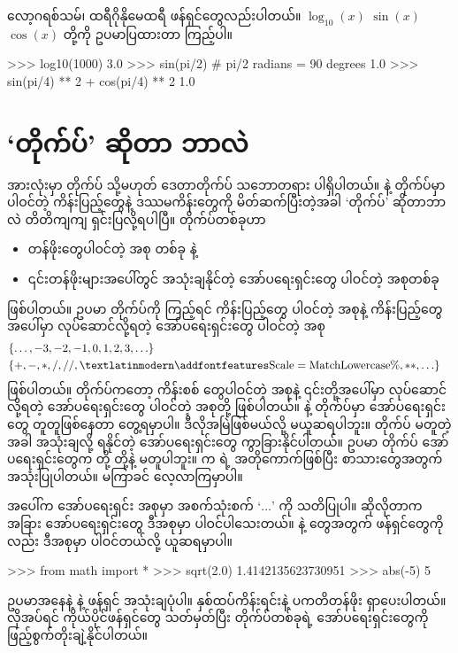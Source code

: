 လော့ဂရစ်သမ်၊ ထရီဂိုနိုမေထရီ ဖန်ရှင်တွေလည်းပါတယ်။ $\log_{10}(x)$\fEn{,} $\sin(x)$\fEn{,} $\cos(x)$ တို့ကို ဥပမာပြထားတာ ကြည့်ပါ။
\begin{codetxt}
>>> log10(1000)
3.0
>>> sin(pi/2) # pi/2 radians = 90 degrees
1.0
>>> sin(pi/4) ** 2 + cos(pi/4) ** 2
1.0
\end{codetxt}


\section{‘တိုက်ပ်’ ဆိုတာ ဘာလဲ}
 အားလုံးမှာ တိုက်ပ် သို့မဟုတ် ဒေတာတိုက်ပ် သဘောတရား ပါရှိပါတယ်။  နဲ့  တိုက်ပ်မှာ ပါဝင်တဲ့ ကိန်းပြည့်တွေနဲ့ ဒဿမကိန်းတွေကို မိတ်ဆက်ပြီးတဲ့အခါ ‘တိုက်ပ်’ ဆိုတာဘာလဲ တိတိကျကျ ရှင်းပြလို့ရပါပြီ။ တိုက်ပ်တစ်ခုဟာ
%
\begin{itemize}
  \item တန်ဖိုးတွေပါဝင်တဲ့ အစု  တစ်ခု နဲ့
  \item ၎င်းတန်ဖိုးများအပေါ်တွင် အသုံးချနိုင်တဲ့ အော်ပရေးရှင်းတွေ ပါဝင်တဲ့ အစုတစ်ခု
\end{itemize}
%
ဖြစ်ပါတယ်။ ဥပမာ  တိုက်ပ်ကို ကြည့်ရင် ကိန်းပြည့်တွေ ပါဝင်တဲ့ အစုနဲ့ ကိန်းပြည့်တွေအပေါ်မှာ လုပ်ဆောင်လို့ရတဲ့  အော်ပရေးရှင်းတွေ ပါဝင်တဲ့ အစု
%
\begin{align*}
& \{\ldots , -3, -2, -1, 0, 1, 2, 3, \ldots \} &\\
& \{+, -, *, /, //, \SI{}{\fEn{\percent}}, **, \ldots \} &%
\end{align*}
ဖြစ်ပါတယ်။  တိုက်ပ်ကတော့ ကိန်းစစ်  တွေပါဝင်တဲ့ အစုနဲ့ ၎င်းတို့အပေါ်မှာ လုပ်ဆောင်လို့ရတဲ့  အော်ပရေးရှင်းတွေ ပါဝင်တဲ့ အစုတို့ ဖြစ်ပါတယ်။  နဲ့  တိုက်ပ်မှာ အော်ပရေးရှင်းတွေ တူတူဖြစ်နေတာ တွေ့ရမှာပါ။ ဒီလိုအမြဲဖြစ်မယ်လို့ မယူဆရပါဘူး။ တိုက်ပ် မတူတဲ့အခါ အသုံးချလို့ ရနိုင်တဲ့ အော်ပရေးရှင်းတွေ ကွာခြားနိုင်ပါတယ်။ ဥပမာ  တိုက်ပ် အော်ပရေးရှင်းတွေက  တို့  တို့နဲ့ မတူပါဘူး။  က  ရဲ့ အတိုကောက်ဖြစ်ပြီး စာသားတွေအတွက် အသုံးပြုပါတယ်။ မကြာခင် လေ့လာကြမှာပါ။

အပေါ်က အော်ပရေးရှင်း အစုမှာ အစက်သုံးစက် $‘\ldots’$ ကို သတိပြုပါ။ ဆိုလိုတာက အခြား အော်ပရေးရှင်းတွေ ဒီအစုမှာ ပါဝင်ပါသေးတယ်။  နဲ့  တွေအတွက် ဖန်ရှင်တွေကိုလည်း ဒီအစုမှာ ပါဝင်တယ်လို့ ယူဆရမှာပါ။
%
\setlength{\fboxsep}{0pt}
\begin{codetxt}
>>> from math import *
>>> sqrt(2.0)
1.4142135623730951
>>> abs(-5)
5
\end{codetxt}
% 
ဥပမာအနေနဲ့  နဲ့  ဖန်ရှင် အသုံးချပုံပါ။ နှစ်ထပ်ကိန်းရင်းနဲ့ ပကတိတန်ဖိုး ရှာပေးပါတယ်။ လိုအပ်ရင် ကိုယ်ပိုင်ဖန်ရှင်တွေ သတ်မှတ်ပြီး တိုက်ပ်တစ်ခုရဲ့ အော်ပရေးရှင်းတွေကို ဖြည့်စွက်တိုးချဲ့နိုင်ပါတယ်။

